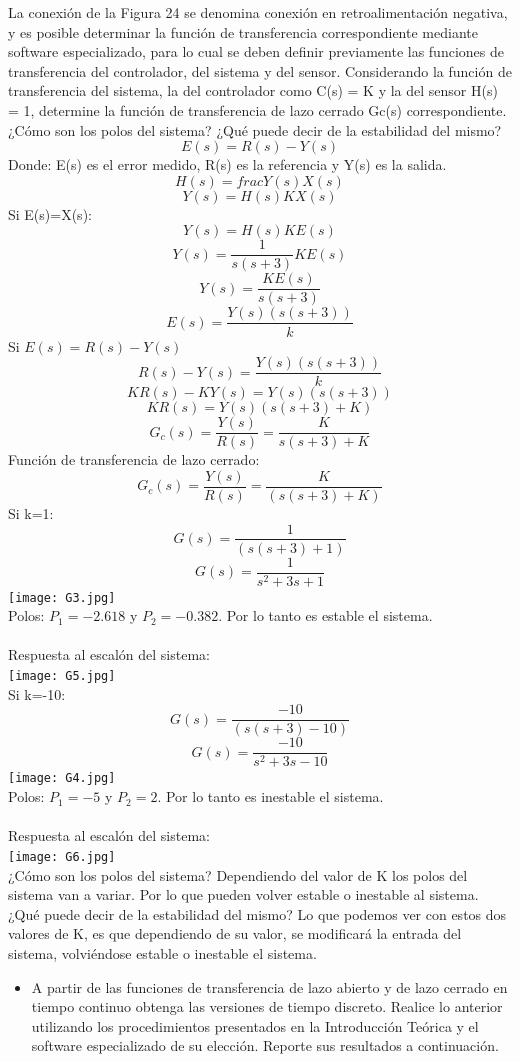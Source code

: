 La conexión de la Figura 24 se denomina conexión en retroalimentación negativa, y es posible determinar la función de transferencia correspondiente mediante software especializado, para lo cual se deben definir
previamente las funciones de transferencia del controlador, del sistema y del sensor. Considerando la función de transferencia del sistema, la del controlador como C(s) = K y la del sensor H(s) = 1, determine
la función de transferencia de lazo cerrado Gc(s) correspondiente. ¿Cómo son los polos del sistema? ¿Qué puede decir de la estabilidad del mismo?
$$E(s)=R(s)-Y(s)$$
Donde: E(s) es el error medido, R(s) es la referencia y Y(s) es la salida.
$$H(s)=frac{Y(s)}{X(s)}$$
$$Y(s)=H(s)KX(s)$$
Si E(s)=X(s):
$$Y(s)=H(s)KE(s)$$
$$Y(s)=\frac{1}{s(s+3)}KE(s)$$
$$Y(s)=\frac{KE(s)}{s(s+3)}$$
$$E(s)=\frac{Y(s)(s(s+3))}{k}$$
Si $E(s)=R(s)-Y(s)$
$$R(s)-Y(s)=\frac{Y(s)(s(s+3))}{k}$$
$$KR(s)-KY(s)=Y(s)(s(s+3))$$
$$KR(s)=Y(s)(s(s+3)+K)$$
$$G_{c}(s)=\frac{Y(s)}{R(s)}=\frac{K}{s(s+3)+K}$$
Función de transferencia de lazo cerrado:
$$G_{c}(s)=\frac{Y(s)}{R(s)}=\frac{K}{(s(s+3)+K)}$$	
Si k=1:
$$G(s)=\frac{1}{(s(s+3)+1)}$$	
$$G(s)=\frac{1}{s^{2}+3s+1}$$	
\texttt{[image: G3.jpg]}\\ 
Polos: $P_{1}=-2.618$ y $P_{2}=-0.382$. Por lo tanto es estable el sistema.\\\\
Respuesta al escalón del sistema:\\
\texttt{[image: G5.jpg]}\\
Si k=-10:
$$G(s)=\frac{-10}{(s(s+3)-10)}$$	
$$G(s)=\frac{-10}{s^{2}+3s-10}$$
\texttt{[image: G4.jpg]}\\ 	
Polos: $P_{1}=-5$ y $P_{2}=2$. Por lo tanto es inestable el sistema.\\\\
Respuesta al escalón del sistema:\\
\texttt{[image: G6.jpg]}\\
¿Cómo son los polos del sistema? Dependiendo del valor de K los polos del sistema van a variar. Por lo que pueden volver estable o inestable al sistema.\\
¿Qué puede decir de la estabilidad del mismo? Lo que podemos ver con estos dos valores de K, es que dependiendo de su valor, se modificará la entrada del sistema, volviéndose estable o inestable el sistema.

\begin{itemize}
	\item A partir de las funciones de transferencia de lazo abierto y de lazo cerrado en tiempo continuo obtenga las versiones de tiempo discreto. Realice lo anterior utilizando los procedimientos presentados en la
	Introducción Teórica y el software especializado de su elección. Reporte sus resultados a continuación.
\end{itemize}

